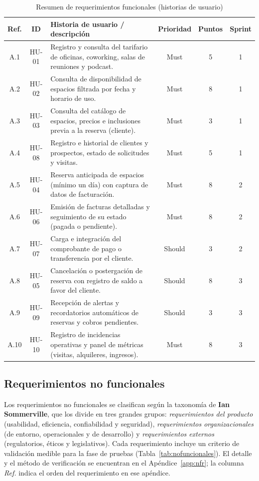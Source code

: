 \documentclass[12pt,a4paper]{article}
\begin{document}
\begin{table}[H]
\centering
\small
\caption{Resumen de requerimientos funcionales (historias de usuario)}
\label{tab:funcionales}
\begin{tabular}{c c p{6.4cm} c c c}
\toprule
\textbf{Ref.} & \textbf{ID} & \textbf{Historia de usuario / descripci\'on} & \textbf{Prioridad} & \textbf{Puntos} & \textbf{Sprint} \\
\midrule
A.1 & HU-01 & Registro y consulta del tarifario de oficinas, coworking, salas de reuniones y podcast. & Must & 5 & 1 \\
A.2 & HU-02 & Consulta de disponibilidad de espacios filtrada por fecha y horario de uso. & Must & 8 & 1 \\
A.3 & HU-03 & Consulta del cat\'alogo de espacios, precios e inclusiones previa a la reserva (cliente). & Must & 3 & 1 \\
A.4 & HU-08 & Registro e historial de clientes y prospectos, estado de solicitudes y visitas. & Must & 5 & 1 \\
\midrule
A.5 & HU-04 & Reserva anticipada de espacios (m\'inimo un d\'ia) con captura de datos de facturaci\'on. & Must & 8 & 2 \\
A.6 & HU-06 & Emisi\'on de facturas detalladas y seguimiento de su estado (pagada o pendiente). & Must & 8 & 2 \\
A.7 & HU-07 & Carga e integraci\'on del comprobante de pago o transferencia por el cliente. & Should & 3 & 2 \\
\midrule
A.8 & HU-05 & Cancelaci\'on o postergaci\'on de reserva con registro de saldo a favor del cliente. & Should & 8 & 3 \\
A.9 & HU-09 & Recepci\'on de alertas y recordatorios autom\'aticos de reservas y cobros pendientes. & Should & 3 & 3 \\
A.10 & HU-10 & Registro de incidencias operativas y panel de m\'etricas (visitas, alquileres, ingresos). & Must & 8 & 3 \\
\bottomrule
\end{tabular}
\end{table}

\subsection{Requerimientos no funcionales}
Los requerimientos no funcionales se clasifican seg\'un la taxonom\'ia de \textbf{Ian Sommerville}, que los divide en tres grandes grupos: \textit{requerimientos del producto} (usabilidad, eficiencia, confiabilidad y seguridad), \textit{requerimientos organizacionales} (de entorno, operacionales y de desarrollo) y \textit{requerimientos externos} (regulatorios, \'eticos y legislativos). Cada requerimiento incluye un criterio de validaci\'on medible para la fase de pruebas (Tabla~\ref{tab:nofuncionales}). El detalle y el m\'etodo de verificaci\'on se encuentran en el Ap\'endice~\ref{app:nfr}; la columna \textit{Ref.} indica el orden del requerimiento en ese ap\'endice.
\end{document}
